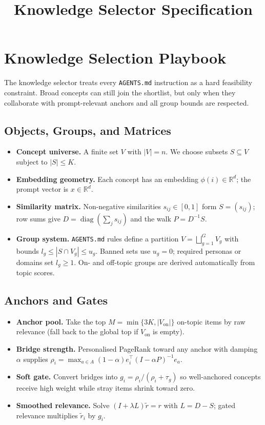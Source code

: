 \documentclass{article}
\begin{document}
\title{Knowledge Selector Specification}
\author{}
\date{}
\maketitle

\section{Knowledge Selection Playbook}
The knowledge selector treats every \texttt{AGENTS.md} instruction as a hard feasibility constraint. Broad concepts can still join the shortlist, but only when they collaborate with prompt-relevant anchors and all group bounds are respected.

\subsection{Objects, Groups, and Matrices}
\begin{itemize}[leftmargin=*]
  \item \textbf{Concept universe.} A finite set $V$ with $|V| = n$. We choose subsets $S \subseteq V$ subject to $|S| \le K$.
  \item \textbf{Embedding geometry.} Each concept has an embedding $\phi(i) \in \mathbb{R}^d$; the prompt vector is $x \in \mathbb{R}^d$.
  \item \textbf{Similarity matrix.} Non-negative similarities $s_{ij} \in [0,1]$ form $S = (s_{ij})$; row sums give $D = \operatorname{diag}(\sum_j s_{ij})$ and the walk $P = D^{-1} S$.
  \item \textbf{Group system.} \texttt{AGENTS.md} rules define a partition $V = \bigsqcup_{g=1}^G V_g$ with bounds $l_g \le |S \cap V_g| \le u_g$. Banned sets use $u_g = 0$; required personas or domains set $l_g \ge 1$. On- and off-topic groups are derived automatically from topic scores.
\end{itemize}

\subsection{Anchors and Gates}
\begin{itemize}[leftmargin=*]
  \item \textbf{Anchor pool.} Take the top $M = \min\{3K, |V_{\mathrm{on}}|\}$ on-topic items by raw relevance (fall back to the global top if $V_{\mathrm{on}}$ is empty).
  \item \textbf{Bridge strength.} Personalised PageRank toward any anchor with damping $\alpha$ supplies $\rho_i = \max_{a \in A} (1-\alpha) e_i^\top (I - \alpha P)^{-1} e_a$.
  \item \textbf{Soft gate.} Convert bridges into $g_i = \rho_i / (\rho_i + \tau_g)$ so well-anchored concepts receive high weight while stray items shrink toward zero.
  \item \textbf{Smoothed relevance.} Solve $(I + \lambda L) \tilde r = r$ with $L = D - S$; gated relevance multiplies $\tilde r_i$ by $g_i$.
\end{itemize}
\end{document}
